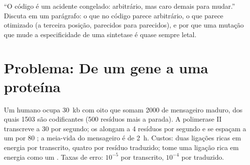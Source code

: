 \begin{exercise}[$\star\star\star$]\label{exo:b1:gene-expression:12}
``O código é um acidente congelado: arbitrário, mas caro demais para
mudar.'' Discuta em um parágrafo: o que no código parece arbitrário, o
que parece otimizado (a terceira posição,  parecidos para
 parecidos), e por que uma mutação que mude a especificidade
de uma sintetase é quase sempre letal.
\end{exercise}

\section{Problema: De um gene a uma proteína}

\begin{problem}
\label{pb:b1:gene-expression:1}
Um  humano ocupa \qty{30}{kb} com oito  que somam \qty{2000}{}
 de mensageiro maduro, dos quais \qty{1503}{} são
codificantes (500 resíduos mais a parada). A polimerase II transcreve a
\qty{30}{}  por segundo; os  alongam a \qty{4}{}
resíduos por segundo e se espaçam a um por \qty{80}{} ; a
meia-vida do mensageiro é de \qty{2}{h}. Custos: duas ligações ricas em
energia por  transcrito, quatro por resíduo traduzido; tome
uma ligação rica em energia como um . Taxas de erro: $10^{-5}$ por
 transcrito, $10^{-4}$ por  traduzido.


\end{problem}
